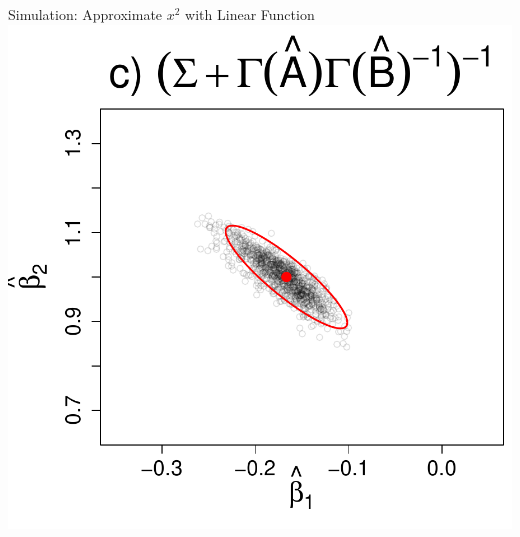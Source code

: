\documentclass[12pt]{beamer}
\begin{document}
\begin{frame}{Simulation: Approximate $x^2$ with Linear Function}
\includegraphics[scale=\tw]{figs/pres_estimator_dls.pdf}
  
\end{frame}





  
\end{document}
